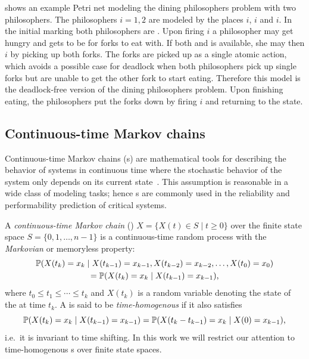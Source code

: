 \begin{runningExample}\label{ex:background:pn}
   shows an example Petri net modeling the dining philosophers problem with two philosophers. The philosophers \(i = 1, 2\) are modeled by the places \(i\), \(i\) and \(i\). In the initial marking both philosophers are . Upon firing \(i\) a philosopher may get hungry and gets to be  for forks to eat with. If both  and  is available, she may then \(i\) by picking up both forks. The forks are picked up as a single atomic action, which avoids a possible case for deadlock when both philosophers pick up single forks but are unable to get the other fork to start eating. Therefore this model is the deadlock-free version of the dining philosophers problem. Upon finishing eating, the philosophers put the forks down by firing \(i\) and returning to the  state.
\end{runningExample}

\subsection{Continuous-time Markov chains}

Continuous-time Markov chains (s) are mathematical tools for describing the behavior of systems in continuous time where the stochastic behavior of the system only depends on its current state~. This assumption is reasonable in a wide class of modeling tasks; hence s are commonly used in the reliability and performability prediction of critical systems.

\begin{dfn}
  A \emph{continuous-time Markov chain} ()
  \(X = \{ X(t) \in S \mid t \ge 0 \}\) over the finite state
  space $S = \{0, 1, \ldots, n - 1\}$ is a continuous-time random
  process with the \emph{Markovian} or memoryless property:
  \begin{multline}\allowdisplaybreaks[0]
    \Pr(X(t_k) = x_k \mid X(t_{k - 1}) = x_{k - 1}, X(t_{k -
      2}) = x_{k - 2}, \ldots, X(t_{0}) = x_{0}) \\
    = \Pr(X(t_k) = x_k \mid X(t_{k - 1}) = x_{k - 1}) \text,
  \end{multline}
  where $t_0 \le t_1 \le \cdots \le t_k$ and $X(t_k)$ is a random variable denoting the state of the  at time $t_k$. A  is said to be
  \emph{time-homogenous} if it also satisfies
  \begin{equation}
    \Pr(X(t_k) = x_k \mid X(t_{k - 1}) = x_{k - 1}) = \Pr(X(t_k - t_{k -
      1}) = x_k \mid X(0) = x_{k - 1}) \text,
  \end{equation}
  i.e.~it is invariant to time shifting. In this work we will restrict our attention to time-homogenous s over finite state spaces.
\end{dfn}

